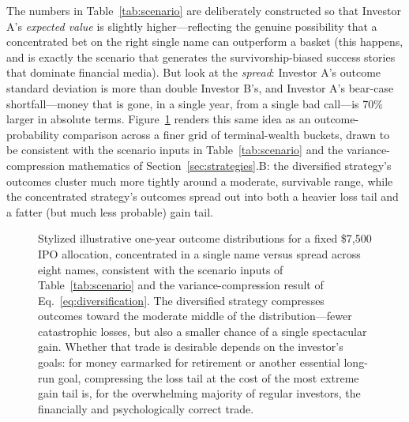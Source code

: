 \documentclass[conference]{IEEEtran}
\begin{document}
The numbers in Table~\ref{tab:scenario} are deliberately constructed so that Investor A's \emph{expected value} is slightly higher---reflecting the genuine possibility that a concentrated bet on the right single name can outperform a basket (this happens, and is exactly the scenario that generates the survivorship-biased success stories that dominate financial media). But look at the \emph{spread}: Investor A's outcome standard deviation is more than double Investor B's, and Investor A's bear-case shortfall---money that is gone, in a single year, from a single bad call---is 70\% larger in absolute terms. Figure~\ref{fig:wealthdist} renders this same idea as an outcome-probability comparison across a finer grid of terminal-wealth buckets, drawn to be consistent with the scenario inputs in Table~\ref{tab:scenario} and the variance-compression mathematics of Section~\ref{sec:strategies}.B: the diversified strategy's outcomes cluster much more tightly around a moderate, survivable range, while the concentrated strategy's outcomes spread out into both a heavier loss tail and a fatter (but much less probable) gain tail.

\begin{figure}[!t]
\centering
{}
\caption{Stylized illustrative one-year outcome distributions for a fixed \$7{,}500 IPO allocation, concentrated in a single name versus spread across eight names, consistent with the scenario inputs of Table~\ref{tab:scenario} and the variance-compression result of Eq.~\eqref{eq:diversification}. The diversified strategy compresses outcomes toward the moderate middle of the distribution---fewer catastrophic losses, but also a smaller chance of a single spectacular gain. Whether that trade is desirable depends on the investor's goals: for money earmarked for retirement or another essential long-run goal, compressing the loss tail at the cost of the most extreme gain tail is, for the overwhelming majority of regular investors, the financially and psychologically correct trade.}
\label{fig:wealthdist}
\end{figure}
\end{document}
